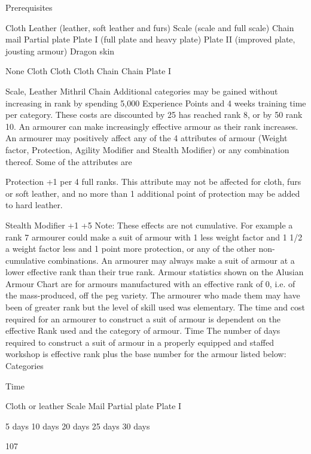 \documentclass[a4paper]{article}
\begin{document}
\begin{multicols}{3}
Prerequisites

Cloth
Leather (leather, soft leather and
furs)
Scale (scale and full scale)
Chain mail
Partial plate
Plate I (full plate and heavy plate)
Plate II (improved plate, jousting
armour)
Dragon skin

None
Cloth
Cloth
Cloth
Chain
Chain
Plate I

Scale,
Leather
Mithril
Chain
Additional categories may be gained without increasing in rank by spending 5,000 Experience
Points and 4 weeks training time per category.
These costs are discounted by 25%
has reached rank 8, or by 50%
rank 10.
An armourer can make increasingly effective
armour as their rank increases.
An armourer may positively affect any of the 4
attributes of armour (Weight factor, Protection,
Agility Modifier and Stealth Modifier) or any
combination thereof. Some of the attributes are

Protection +1 per 4 full ranks. This attribute may
not be affected for cloth, furs or soft leather, and no
more than 1 additional point of protection may be
added to hard leather.

Stealth Modifier +1%
+5%
Note: These effects are not cumulative. For example a rank 7 armourer could make a suit of armour
with 1 less weight factor and 1%
1/2 a weight factor less and 1 point more protection, or any of the other non-cumulative combinations. An armourer may always make a suit of
armour at a lower effective rank than their true
rank.
Armour statistics shown on the Alusian Armour
Chart are for armours manufactured with an effective rank of 0, i.e. of the mass-produced, off the
peg variety. The armourer who made them may
have been of greater rank but the level of skill used
was elementary.
The time and cost required for an armourer to
construct a suit of armour is dependent on the
effective Rank used and the category of armour.
Time The number of days required to construct a
suit of armour in a properly equipped and staffed
workshop is effective rank plus the base number
for the armour listed below:
Categories

Time

Cloth or leather
Scale
Mail
Partial plate
Plate I

5 days
10 days
20 days
25 days
30 days

107


\end{multicols}
\end{document}
